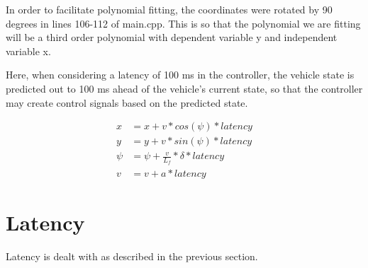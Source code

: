 \documentclass[]{scrartcl}
\begin{document}
In order to facilitate polynomial fitting, the coordinates were rotated by 90 degrees in lines 106-112 of main.cpp. This is so that the polynomial we are fitting will be a third order polynomial with dependent variable y and independent variable x.

Here, when considering a latency of 100 ms in the controller, the vehicle state is predicted out to 100 ms ahead of the vehicle's current state, so that the controller may create control signals based on the predicted state. 

\begin{align}
x & = x + v * cos(\psi) * latency \nonumber \\
y & = y + v * sin(\psi) * latency \nonumber \\
\psi & = \psi + \frac{v}{L_f} * \delta * latency \nonumber \\
v & = v + a * latency \nonumber
\end{align}

\section{Latency}
Latency is dealt with as described in the previous section.
\end{document}
